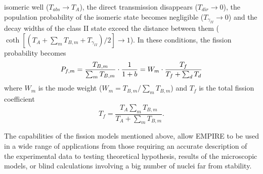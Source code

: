 isomeric well ($T_{abs}\rightarrow T_{A}$), the direct transmission
disappears ($T_{dir}\rightarrow0$), the population probability of the
isomeric%
 state becomes negligible ($T_{\gamma_{II}}\rightarrow0$)
and the decay widths of the class II state exceed the distance between them (%
$%
\coth[(T_{A}+\sum_{m}T_{B,m}+T_{\gamma_{II}})/2]\rightarrow1$). In these
conditions, the fission probability becomes
\begin{equation}
P_{f,m}=\frac{T_{B,m}}{\sum_{m}T_{B,m}}\cdot\frac{1}{1+b}=W_{m}\cdot\frac{%
T_{f}}{T_{f}+\sum_{d}T_{d}}  \label{wm}
\end{equation}
\noindent where $W_{m}$ is the mode weight ($W_{m}=T_{B,m}/\sum_{m}T_{B,m}$)
and $T_{f}$ is the total fission coefficient
\begin{equation}
T_{f}=\frac{T_{A}\sum_{m}T_{B,m}}{T_{A}+\sum_{m}T_{B,m}}.
\end{equation}

The capabilities of the fission models mentioned above, allow EMPIRE to be
used in a wide range of applications from those requiring an accurate
description of the experimental data to testing theoretical hypothesis,
results of the microscopic models, or blind calculations involving a big
number of nuclei far from stability.

